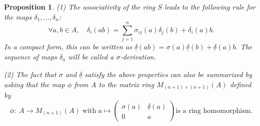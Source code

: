\documentclass[12pt,a4paper]{article}
\newtheorem{proposition}[theorem]{Proposition}
\newcommand{\de}{\delta}
\newcommand{\si}{\sigma}
\newcommand{\ua}{\underline{a}}
\newcommand{\ud}{\underline{\delta}}
\begin{document}
	\begin{proposition} \label{Pro for assoc. and hom}
		(1) The associativity of the ring $S$ leads to the following rule for 
		the maps $\de_1,\dots,\de_n$:
		\begin{equation}
		\forall a,b \in A, \quad \de_i(ab)=
		\sum_{j=1}^n\si_{ij}(a)\de_j(b)+\de_i(a)b.
		\end{equation}
		In a compact form, this can be written as $\underline{\de}(ab)=\si(a)\underline{\de}(b)+\underline{\de}(a)b.$  The sequence of maps $\delta_{\ua}$ will be called a $\sigma$-derivation.
		
		(2) The fact that $\si$ and $\ud$ satisfy  the above properties can also be summarized by asking that the map $\phi$ from $A$ to the  matrix ring $M_{(n+1)\times (n+1)}(A)$ defined by
		$$
		\phi:\; A \rightarrow M_{(n+1)}(A) \; \text{with} \; a \mapsto \begin{pmatrix}
			\si(a) & \underline{\de}(a) \\
			0 & a
		\end{pmatrix} \text{is a ring homomorphism.}$$ 
	\end{proposition}
	
\end{document}
